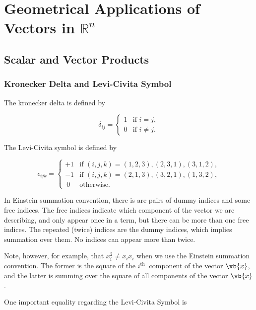 \documentclass[a4paper,12pt]{report}
\begin{document}
\chapter{Geometrical Applications of Vectors in \(\mathbb{R}^{n} \)}

\section{Scalar and Vector Products}

\subsection{Kronecker Delta and Levi-Civita Symbol}

The kronecker delta is defined by 

\begin{equation}
\delta_{ij} =
\begin{cases} 
1 & \text{if } i = j, \\
0 & \text{if } i \neq j.
\end{cases}
\end{equation}

The Levi-Civita symbol is defined by 

\begin{equation}
    \epsilon_{ijk} =
\begin{cases} 
+1 & \text{if } (i, j, k) = (1, 2, 3), (2, 3, 1), (3, 1, 2), \\
-1 & \text{if } (i, j, k) = (2, 1, 3), (3, 2, 1), (1, 3, 2), \\
~0 & \text{otherwise}.
\end{cases}
\end{equation}

In Einstein summation convention, there is are pairs of dummy indices and some free indices. The free indices indicate which component of the vector we are describing, and only appear once in a term, but there can be more than one free indices. The repeated (twice) indices are the dummy indices, which implies summation over them. No indices can appear more than twice. 

Note, however, for example, that \(x_{i}^2 \neq x_{i}x_{i}   \) when we use the Einstein summation convention. The former is the square of the \(i^{\text{th }} \) component of the vector \(\vb{x} \), and the latter is summing over the square of all components of the vector \(\vb{x} \).    

One important equality regarding the Levi-Civita Symbol is 
\end{document}
